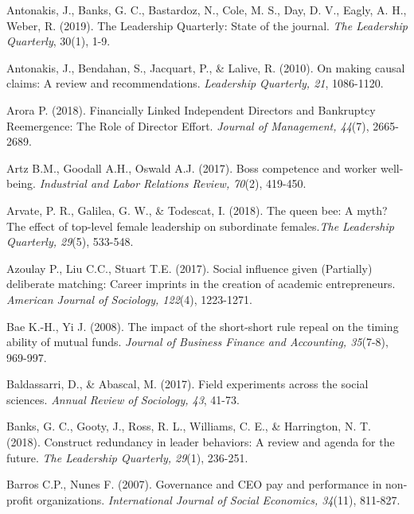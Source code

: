 \documentclass[english]{article}
\begin{document}
\begin{singlespace}
\begin{list}{}{\setlength\itemindent{-\leftmargin}}
\item Antonakis, J., Banks, G. C., Bastardoz, N., Cole, M. S., Day, D. V., Eagly, A. H.,  Weber, R. (2019). The Leadership Quarterly: State of the journal. \emph{The Leadership Quarterly}, 30(1), 1-9.

\item Antonakis, J., Bendahan, S., Jacquart, P., \& Lalive, R. (2010). On making causal claims: A review and recommendations. \emph{Leadership Quarterly, 21}, 1086-1120.

\item *Arora P. (2018). Financially Linked Independent Directors and Bankruptcy Reemergence: The Role of Director Effort. \emph{Journal of Management, 44}(7), 2665-2689.

\item *Artz B.M., Goodall A.H., Oswald A.J. (2017). Boss competence and worker well-being. \emph{Industrial and Labor Relations Review, 70}(2), 419-450.

\item *Arvate, P. R., Galilea, G. W., \& Todescat, I. (2018). The queen bee: A myth? The effect of top-level female leadership on subordinate females.\emph{The Leadership Quarterly, 29}(5), 533-548.

\item *Azoulay P., Liu C.C., Stuart T.E. (2017). Social influence given (Partially) deliberate matching: Career imprints in the creation of academic entrepreneurs. \emph{American Journal of Sociology, 122}(4), 1223-1271.

\item *Bae K.-H., Yi J. (2008). The impact of the short-short rule repeal on the timing ability of mutual funds. \emph{Journal of Business Finance and Accounting, 35}(7-8), 969-997.

\item Baldassarri, D., \& Abascal, M. (2017). Field experiments across the social sciences. \emph{Annual Review of Sociology, 43}, 41-73.

\item Banks, G. C., Gooty, J., Ross, R. L., Williams, C. E., \& Harrington, N.  T. (2018). Construct redundancy in leader behaviors: A review and agenda for the future. \emph{The Leadership Quarterly, 29}(1), 236-251.

\item *Barros C.P., Nunes F. (2007). Governance and CEO pay and performance in non-profit organizations. \emph{International Journal of Social Economics, 34}(11), 811-827.


\end{list}
\end{singlespace}
\end{document}

